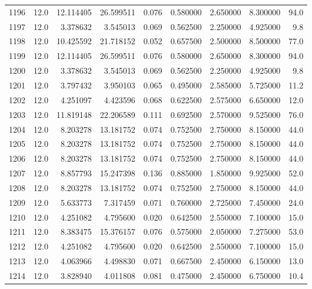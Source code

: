 \begin{tabular}{lrrrrrrrr}
1196 &   12.0 &  12.114405 &  26.599511 &  0.076 &  0.580000 &  2.650000 &   8.300000 &   94.0 \\
1197 &   12.0 &   3.378632 &   3.545013 &  0.069 &  0.562500 &  2.250000 &   4.925000 &    9.8 \\
1198 &   12.0 &  10.425592 &  21.718152 &  0.052 &  0.657500 &  2.500000 &   8.500000 &   77.0 \\
1199 &   12.0 &  12.114405 &  26.599511 &  0.076 &  0.580000 &  2.650000 &   8.300000 &   94.0 \\
1200 &   12.0 &   3.378632 &   3.545013 &  0.069 &  0.562500 &  2.250000 &   4.925000 &    9.8 \\
1201 &   12.0 &   3.797432 &   3.950103 &  0.065 &  0.495000 &  2.585000 &   5.725000 &   11.2 \\
1202 &   12.0 &   4.251097 &   4.423596 &  0.068 &  0.622500 &  2.575000 &   6.650000 &   12.0 \\
1203 &   12.0 &  11.819148 &  22.206589 &  0.111 &  0.692500 &  2.570000 &   9.525000 &   76.0 \\
1204 &   12.0 &   8.203278 &  13.181752 &  0.074 &  0.752500 &  2.750000 &   8.150000 &   44.0 \\
1205 &   12.0 &   8.203278 &  13.181752 &  0.074 &  0.752500 &  2.750000 &   8.150000 &   44.0 \\
1206 &   12.0 &   8.203278 &  13.181752 &  0.074 &  0.752500 &  2.750000 &   8.150000 &   44.0 \\
1207 &   12.0 &   8.857793 &  15.247398 &  0.136 &  0.885000 &  1.850000 &   9.925000 &   52.0 \\
1208 &   12.0 &   8.203278 &  13.181752 &  0.074 &  0.752500 &  2.750000 &   8.150000 &   44.0 \\
1209 &   12.0 &   5.633773 &   7.317459 &  0.071 &  0.760000 &  2.725000 &   7.450000 &   24.0 \\
1210 &   12.0 &   4.251082 &   4.795600 &  0.020 &  0.642500 &  2.550000 &   7.100000 &   15.0 \\
1211 &   12.0 &   8.383475 &  15.376157 &  0.076 &  0.575000 &  2.050000 &   7.275000 &   53.0 \\
1212 &   12.0 &   4.251082 &   4.795600 &  0.020 &  0.642500 &  2.550000 &   7.100000 &   15.0 \\
1213 &   12.0 &   4.063966 &   4.498830 &  0.071 &  0.667500 &  2.450000 &   6.150000 &   13.0 \\
1214 &   12.0 &   3.828940 &   4.011808 &  0.081 &  0.475000 &  2.450000 &   6.750000 &   10.4 \\

\end{tabular}
